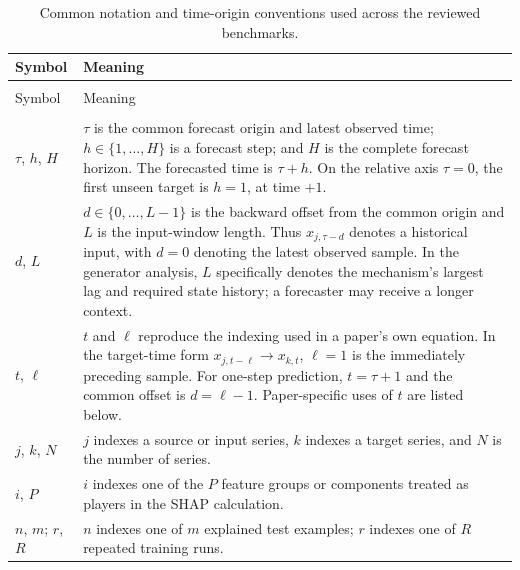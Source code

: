\begingroup
\small
\setlength{\LTpre}{0.4\baselineskip}
\setlength{\LTpost}{0.7\baselineskip}
\renewcommand{\arraystretch}{1.08}
\begin{longtable}{@{}
>{\raggedright\arraybackslash}p{}
>{\raggedright\arraybackslash}p{}@{}}
\caption{Common notation and time-origin conventions used across the reviewed
benchmarks.}
\label{tab:notation}\\
\toprule
Symbol & Meaning \\
\midrule
\endfirsthead
\multicolumn{2}{@{}l}{\small\emph{Table~\thetable\ continued}}\\
\toprule
Symbol & Meaning \\
\midrule
\endhead
\midrule
\multicolumn{2}{r@{}}{\small\emph{Continued on the next page}}\\
\endfoot
\bottomrule
\endlastfoot

$\tau$, $h$, $H$ &
$\tau$ is the common forecast origin and latest observed time;
$h\in\{1,\ldots,H\}$ is a forecast step; and $H$ is the complete forecast
horizon. The forecasted time is $\tau+h$. On the relative axis $\tau=0$, the
first unseen target is $h=1$, at time $+1$. \\

$d$, $L$ &
$d\in\{0,\ldots,L-1\}$ is the backward offset from the common origin and $L$
is the input-window length. Thus $x_{j,\tau-d}$ denotes a historical input,
with $d=0$ denoting the latest observed sample. In the generator analysis,
$L$ specifically denotes the mechanism's largest lag and required state
history; a forecaster may receive a longer context. \\

$t$, $\ell$ &
$t$ and $\ell$ reproduce the indexing used in a paper's own equation. In the
target-time form $x_{j,t-\ell}\rightarrow x_{k,t}$, $\ell=1$ is the immediately
preceding sample. For one-step prediction, $t=\tau+1$ and the common offset is
$d=\ell-1$. Paper-specific uses of $t$ are listed below. \\

$j$, $k$, $N$ &
$j$ indexes a source or input series, $k$ indexes a target series, and $N$ is
the number of series. \\

$i$, $P$ &
$i$ indexes one of the $P$ feature groups or components treated as players in
the SHAP calculation. \\

$n$, $m$; $r$, $R$ &
$n$ indexes one of $m$ explained test examples; $r$ indexes one of $R$
repeated training runs. \\


\end{longtable}
